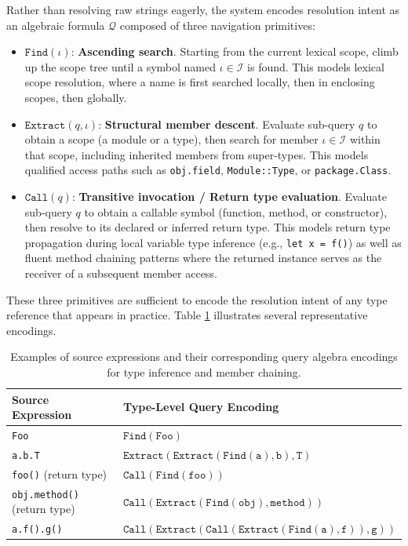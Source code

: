 Rather than resolving raw strings eagerly, the system encodes
resolution intent as an algebraic formula $\mathcal{Q}$ composed of
three navigation primitives:

\begin{itemize}
  \item $\texttt{Find}(\iota)$: \textbf{Ascending search}. Starting from
    the current lexical scope, climb up the scope tree until a symbol
    named $\iota \in \mathcal{I}$ is found. This models lexical scope
    resolution, where a
    name is first searched locally, then in enclosing scopes, then globally.
  \item $\texttt{Extract}(q, \iota)$: \textbf{Structural member descent}.
    Evaluate sub-query $q$ to obtain a scope (a module or a type),
    then search for member $\iota \in \mathcal{I}$ within that scope,
    including inherited
    members from super-types. This models qualified access paths such
    as \texttt{obj.field}, \texttt{Module::Type}, or
    \texttt{pack}\-\texttt{age.}\-\texttt{Class}.
  \item $\texttt{Call}(q)$: \textbf{Transitive invocation / Return
    type evaluation}.
    Evaluate sub-query $q$ to obtain a callable symbol (function,
    method, or constructor),
    then resolve to its declared or inferred return type. This models
    return type propagation
    during local variable type inference (e.g., \texttt{let x = f()})
    as well as fluent
    method chaining patterns where the returned instance serves as
    the receiver of a subsequent member access.
\end{itemize}

These three primitives are sufficient to encode the resolution intent
of any type reference that appears in practice. Table
\ref{tab:query_examples} illustrates several representative encodings.

\begin{table}[htpb]
  \centering
  \small
  \begin{tabular}{|l|l|}
    \hline
    \textbf{Source Expression} & \textbf{Type-Level Query Encoding} \\ \hline
    \texttt{Foo} & $\texttt{Find}(\texttt{Foo})$ \\ \hline
    \texttt{a.b.T} &
    $\texttt{Extract}(\texttt{Extract}(\texttt{Find}(\texttt{a}),
    \texttt{b}), \texttt{T})$ \\ \hline
    \texttt{foo()} (return type) &
    $\texttt{Call}(\texttt{Find}(\texttt{foo}))$ \\ \hline
    \texttt{obj.method()} (return type) &
    $\texttt{Call}(\texttt{Extract}(\texttt{Find}(\texttt{obj}),
    \texttt{method}))$ \\ \hline
    \texttt{a.f().g()} &
    $\texttt{Call}(\texttt{Extract}(\texttt{Call}(\texttt{Extract}(\texttt{Find}(\texttt{a}),
    \texttt{f})), \texttt{g}))$ \\ \hline
  \end{tabular}
  \caption{Examples of source expressions and their corresponding
  query algebra encodings for type inference and member chaining.}
  \label{tab:query_examples}
\end{table}

